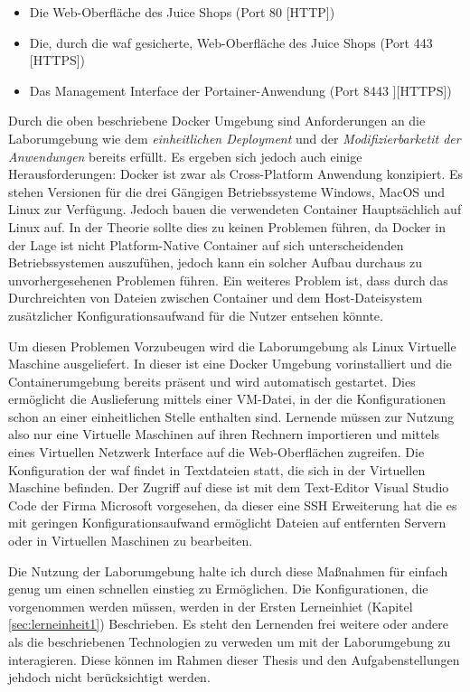\begin{itemize}
    \item Die Web-Oberfläche des Juice Shops (Port 80 [HTTP])
    \item Die, durch die \ac{waf} gesicherte, Web-Oberfläche des Juice Shops (Port 443 [HTTPS])
    \item Das Management Interface der Portainer-Anwendung (Port 8443 ][HTTPS])
\end{itemize}

Durch die oben beschriebene Docker Umgebung sind Anforderungen an die Laborumgebung wie dem \textit{einheitlichen Deployment} und der \textit{Modifizierbarketit der Anwendungen} bereits erfüllt.
Es ergeben sich jedoch auch einige Herausforderungen:
Docker ist zwar als Cross-Platform Anwendung konzipiert.
Es stehen Versionen für die drei Gängigen Betriebssysteme Windows, MacOS und Linux zur Verfügung.
Jedoch bauen die verwendeten Container Hauptsächlich auf Linux auf.
In der Theorie sollte dies zu keinen Problemen führen, da Docker in der Lage ist nicht Platform-Native Container auf sich unterscheidenden Betriebssystemen auszufühen, jedoch kann ein solcher Aufbau durchaus zu unvorhergesehenen Problemen führen.
Ein weiteres Problem ist, dass durch das Durchreichten von Dateien zwischen Container und dem Host-Dateisystem zusätzlicher Konfigurationsaufwand für die Nutzer entsehen könnte.

Um diesen Problemen Vorzubeugen wird die Laborumgebung als Linux Virtuelle Maschine ausgeliefert.
In dieser ist eine Docker Umgebung vorinstalliert und die Containerumgebung bereits präsent und wird automatisch gestartet.
Dies ermöglicht die Auslieferung mittels einer VM-Datei, in der die Konfigurationen schon an einer einheitlichen Stelle enthalten sind.
Lernende müssen zur Nutzung also nur eine Virtuelle Maschinen auf ihren Rechnern importieren und mittels eines Virtuellen Netzwerk Interface auf die Web-Oberflächen zugreifen.
Die Konfiguration der \ac{waf} findet in Textdateien statt, die sich in der Virtuellen Maschine befinden.
Der Zugriff auf diese ist mit dem Text-Editor Visual Studio Code der Firma Microsoft vorgesehen, da dieser eine SSH Erweiterung hat die es mit geringen Konfigurationsaufwand ermöglicht Dateien auf entfernten Servern oder in Virtuellen Maschinen zu bearbeiten.

Die Nutzung der Laborumgebung halte ich durch diese Maßnahmen für einfach genug um einen schnellen einstieg zu Ermöglichen.
Die Konfigurationen, die vorgenommen werden müssen, werden in der Ersten Lerneinhiet (Kapitel \ref{sec:lerneinheit1}) Beschrieben.
Es steht den Lernenden frei weitere oder andere als die beschriebenen Technologien zu verweden um mit der Laborumgebung zu interagieren.
Diese können im Rahmen dieser Thesis und den Aufgabenstellungen jehdoch nicht berücksichtigt werden.

\pagebreak